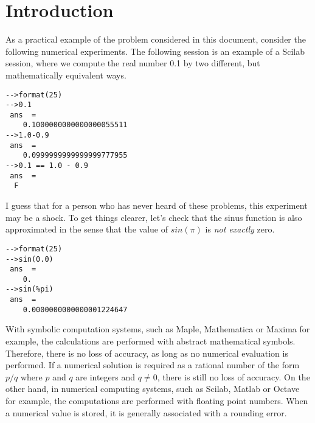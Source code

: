 %

\section{Introduction}

As a practical example of the problem considered in this
document, consider the following numerical experiments. 
The following session is an example of 
a Scilab session, where we compute the real number 0.1 by two different, 
but mathematically equivalent ways.
\lstset{language=scilabscript}
\begin{lstlisting}
-->format(25)
-->0.1
 ans  =
    0.1000000000000000055511  
-->1.0-0.9
 ans  =
    0.0999999999999999777955  
-->0.1 == 1.0 - 0.9
 ans  =
  F  
\end{lstlisting}

I guess that for a person who has never heard of these problems,
this experiment may be a shock. To get things clearer, let's 
check that the sinus function is also approximated in the sense that 
the value of $sin(\pi)$ is \emph{not exactly} zero.
\lstset{language=scilabscript}
\begin{lstlisting}
-->format(25)
-->sin(0.0)
 ans  =
    0.  
-->sin(%pi)
 ans  =
    0.0000000000000001224647  
\end{lstlisting}

With symbolic computation systems, such as Maple\cite{WWWMapleSoft}, 
Mathematica\cite{WWWMathematica} or Maxima\cite{WWWMaxima} for example, 
the calculations are performed with abstract mathematical 
symbols. Therefore, there is no loss of accuracy, as long as 
no numerical evaluation is performed. If a numerical solution is 
required as a rational number of the form $p/q$ where $p$ and $q$ are 
integers and $q\neq 0$, there is still no loss of accuracy.
On the other hand, in numerical computing systems, such as 
Scilab\cite{WWWScilab}, Matlab\cite{WWWMatlab} or Octave\cite{WWWOctave} for example, 
the computations are performed with floating point numbers.
When a numerical value is stored, it is generally associated with a 
rounding error. 

